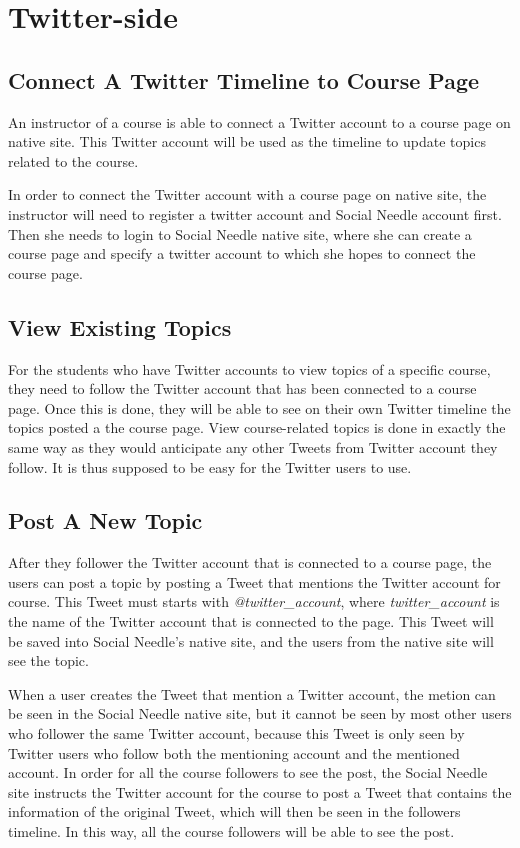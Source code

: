 \section{Twitter-side}


\subsection{Connect A Twitter Timeline to Course Page}

An instructor of a course is able to connect a Twitter account to a
course page on native site. This Twitter account will be used as the
timeline to update topics related to the course.

In order to connect the Twitter account with a course page on native
site, the instructor will need to register a twitter account and
Social Needle account first. Then she needs to login to Social Needle
native site, where she can create a course page and specify a twitter
account to which she hopes to connect the course page.

\subsection{View Existing Topics}

For the students who have Twitter accounts to view topics of a
specific course, they need to follow the Twitter account that has been
connected to a course page. Once this is done, they will be able to
see on their own Twitter timeline the topics posted a the course
page. View course-related topics is done in exactly the same way as
they would anticipate any other Tweets from Twitter account they
follow. It is thus supposed to be easy for the Twitter users to use.

\subsection{Post A New Topic}

After they follower the Twitter account that is connected to a course
page, the users can post a topic by posting a Tweet that mentions the
Twitter account for course. This Tweet must starts with
\textit{@twitter\_account}, where \textit{twitter\_account} is the
name of the Twitter account that is connected to the page. This Tweet
will be saved into Social Needle's native site, and the users from the
native site will see the topic.

When a user creates the Tweet that mention a Twitter account, the
metion can be seen in the Social Needle native site, but it cannot be
seen by most other users who follower the same Twitter account,
because this Tweet is only seen by Twitter users who follow both the
mentioning account and the mentioned account. In order for all the
course followers to see the post, the Social Needle site instructs the
Twitter account for the course to post a Tweet that contains the
information of the original Tweet, which will then be seen in the
followers timeline. In this way, all the course followers will be able
to see the post.

